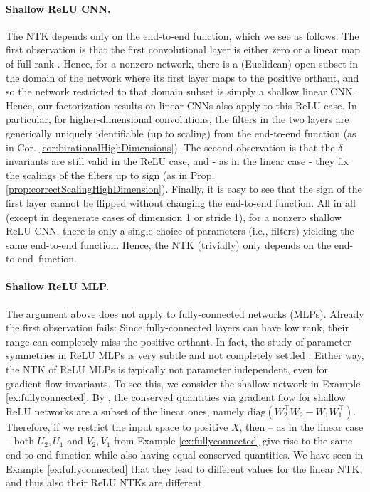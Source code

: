 \documentclass[twoside]{article}
\theoremstyle{definition}
\theoremstyle{remark}
\begin{document}
\paragraph{Shallow ReLU CNN.} The NTK depends only on the end-to-end function, which we see as follows: The first observation is that the first convolutional layer is either zero or a linear map of full rank \cite[Lem. 4.1]{shahverdigeometry}. Hence, for a nonzero network, there is a (Euclidean) open subset in the domain of the network where its first layer maps to the positive orthant, and so the network restricted to that domain subset is simply a shallow linear CNN. Hence, our factorization results on linear CNNs also apply to this ReLU case. In particular, for higher-dimensional convolutions, the filters in the two layers are generically uniquely identifiable (up to scaling) from the end-to-end function (as in Cor. \ref{cor:birationalHighDimensions}). The second observation is that the $\delta$ invariants are still valid in the ReLU case, and - as in the linear case - they fix the scalings of the filters up to sign (as in Prop. \ref{prop:correctScalingHighDimension}). Finally, it is easy to see that the sign of the first layer cannot be flipped without changing the end-to-end function. All in all (except in degenerate cases of dimension 1 or stride 1), for a nonzero shallow ReLU CNN, there is only a single choice of parameters (i.e., filters) yielding the same end-to-end function. Hence, the NTK (trivially) only depends on the end-to-end~function.

 \paragraph{Shallow ReLU MLP.} The  argument above does not apply to fully-connected networks (MLPs). Already the first observation fails: Since fully-connected layers can have low rank, their range can completely miss the positive orthant. In fact, the study of parameter symmetries in ReLU MLPs is very subtle and not completely settled \cite{grigsby23a,ELISENDAGRIGSBY2025110636}. Either way, the NTK of ReLU MLPs is typically not parameter independent, even for gradient-flow  invariants. To see this, we  consider the shallow network in Example \ref{ex:fullyconnected}. By \cite{marcotte2024abide}, the conserved quantities via gradient flow for shallow ReLU networks are a subset of the linear ones, namely $\mathrm{diag}(W_2^\top W_2 - W_1W_1^\top)$. Therefore, if we restrict the input space to positive $X$, then -- as in the linear case -- both $U_2,U_1$ and $V_2,V_1$ 
 from Example \ref{ex:fullyconnected} give rise to the same end-to-end function while also having equal conserved quantities. We have seen in Example \ref{ex:fullyconnected} that they lead to different values for the linear NTK, and thus also their ReLU NTKs are different.
\end{document}
